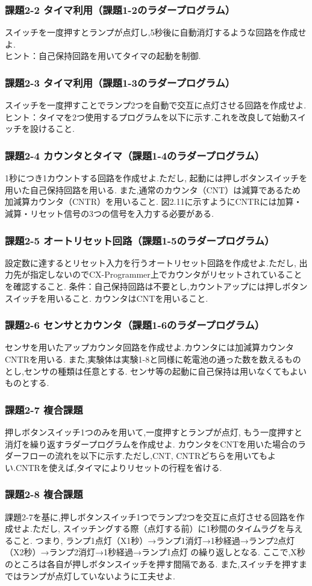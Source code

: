 \subsubsection*{課題2-2 タイマ利用（課題1-2のラダープログラム）}
スイッチを一度押すとランプが点灯し,5秒後に自動消灯するような回路を作成せよ.\\
ヒント：自己保持回路を用いてタイマの起動を制御.

\subsubsection*{課題2-3 タイマ利用（課題1-3のラダープログラム）}
スイッチを一度押すことでランプ2つを自動で交互に点灯させる回路を作成せよ.
ヒント：タイマを2つ使用するプログラムを以下に示す.これを改良して始動スイッチを設けること.

\subsubsection*{課題2-4 カウンタとタイマ（課題1-4のラダープログラム）}
1秒につき1カウントする回路を作成せよ.ただし,
起動には押しボタンスイッチを用いた自己保持回路を用いる.
また,通常のカウンタ（CNT）は減算であるため加減算カウンタ（CNTR）を用いること.
図2.11に示すようにCNTRには加算・減算・リセット信号の3つの信号を入力する必要がある.

\subsubsection*{課題2-5 オートリセット回路（課題1-5のラダープログラム）}
設定数に達するとリセット入力を行うオートリセット回路を作成せよ.ただし,
出力先が指定しないのでCX-Programmer上でカウンタがリセットされていることを確認すること.
条件：自己保持回路は不要とし,カウントアップには押しボタンスイッチを用いること.
カウンタはCNTを用いること.

\subsubsection*{課題2-6 センサとカウンタ（課題1-6のラダープログラム）}
センサを用いたアップカウンタ回路を作成せよ.カウンタには加減算カウンタCNTRを用いる.
また,実験体は実験1-8と同様に乾電池の通った数を数えるものとし,センサの種類は任意とする.
センサ等の起動に自己保持は用いなくてもよいものとする.

\subsubsection*{課題2-7 複合課題}
押しボタンスイッチ1つのみを用いて,一度押すとランプが点灯,
もう一度押すと消灯を繰り返すラダープログラムを作成せよ.
カウンタをCNTを用いた場合のラダーフローの流れを以下に示す.ただし,CNT,
CNTRどちらを用いてもよい.CNTRを使えば,タイマによりリセットの行程を省ける.

\subsubsection*{課題2-8 複合課題}
課題2-7を基に,押しボタンスイッチ1つでランプ2つを交互に点灯させる回路を作成せよ.ただし,
スイッチングする際（点灯する前）に1秒間のタイムラグを与えること.
つまり,
ランプ1点灯（X1秒）→ランプ1消灯→1秒経過→ランプ2点灯（X2秒）→ランプ2消灯→1秒経過→ランプ1点灯
の繰り返しとなる.
ここで,X秒のところは各自が押しボタンスイッチを押す間隔である.
また,スイッチを押すまではランプが点灯していないように工夫せよ.
